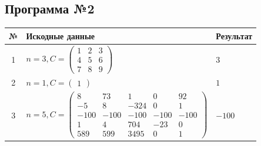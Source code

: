 \subsection{Программа №2}
\begin{center}
    \begin{tabular}{|c|l|l|}
        \hline
        № & Искодные данные & Результат \\\hline
        1 &
        $ n = 3, C =
        \begin{pmatrix}
        1 & 2 & 3 \\
        4 & 5 & 6 \\
        7 & 8 & 9
        \end{pmatrix}
        $ &
        $3$ \\\hline
        2 &
        $ n = 1, C =
        \begin{pmatrix}
        1
        \end{pmatrix}
        $ &
        $1$ \\\hline
        3 &
        $ n = 5, C =
        \begin{pmatrix}
        8 & 73 & 1 & 0 & 92 \\
        -5 & 8 & -324 & 0 & 1 \\
        -100 & -100 & -100 & -100 & -100 \\
        1 & 4 & 704 & -23 & 0 \\
        589 & 599 & 3495 & 0 & 1
        \end{pmatrix}
        $ &
        $-100$ \\\hline
    \end{tabular}
\end{center}

